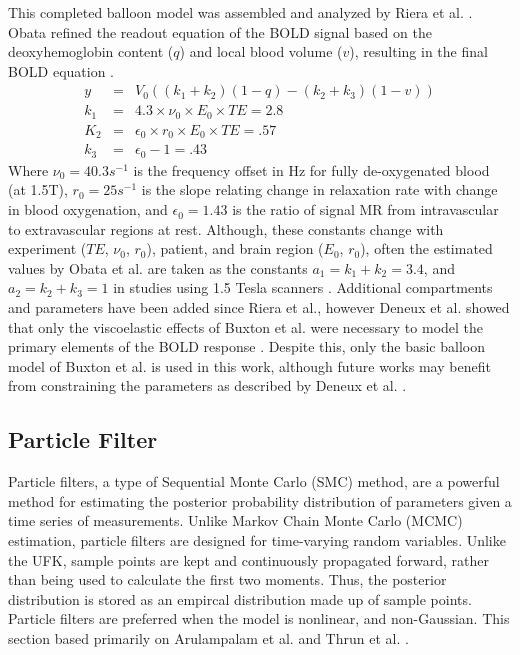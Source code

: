 \documentclass[journal]{./IEEEtran}
\begin{document}
This completed balloon model was assembled and analyzed
by Riera et al. \cite{Riera2003}. Obata refined the readout equation 
of the BOLD signal based on the deoxyhemoglobin content ($q$) and local 
blood volume ($v$), resulting in the final BOLD equation \cite{Obata2004}.
\begin{eqnarray}
y   &=& V_0((k_1 + k_2)(1-q) - (k_2 + k_3)(1-v))\\
k_1 &=& 4.3 \times \nu_0 \times E_0 \times TE = 2.8 \nonumber \\
K_2 &=& \epsilon_0 \times r_0 \times E_0 \times TE = .57 \nonumber \\
k_3 &=& \epsilon_0 - 1 = .43 \nonumber
\label{eq:boldout}
\end{eqnarray}
Where $\nu_0 = 40.3 s^{-1}$  is the frequency offset in Hz for fully
de-oxygenated blood (at 1.5T), $r_0 = 25 s^{-1}$  is the slope relating
change in relaxation rate with change in blood oxygenation, and
$\epsilon_0 = 1.43$ is the ratio of signal MR from intravascular to 
extravascular regions at rest. Although, these constants change with 
experiment ($TE$, $\nu_0$, $r_0$), patient, and brain 
region ($E_0$, $r_0$), often the estimated values by Obata et al. are 
taken as the constants $a_1 = k_1 + k_2 = 3.4$, and $a_2 = k_2+k_3 = 1$ in 
studies using 1.5 Tesla scanners \cite{Obata2004}.
Additional compartments and parameters have been added since 
Riera et al., however Deneux et al. showed that only the viscoelastic
effects of Buxton et al. were necessary to model the primary 
elements of the BOLD response \cite{Riera2003, Deneux2006, Buxton2004}.
Despite this, only the basic balloon model of Buxton et al. is
used in this work, although future works may benefit from constraining
the parameters as described by Deneux et al. \cite{Buxton2004, Deneux2006}.

\subsection{Particle Filter}
\label{sec:ParticleFilters}
Particle filters, a type of Sequential Monte Carlo (SMC) method,
are a powerful method for estimating the posterior probability distribution
 of parameters given a time series of measurements. Unlike Markov 
Chain Monte Carlo (MCMC) estimation, particle filters are designed for 
time-varying random variables. Unlike the UFK, sample points are kept
and continuously propagated forward, rather than being used to calculate
the first two moments. Thus, the posterior distribution is
stored as an empircal distribution made up of sample points.
Particle filters are preferred when the model is nonlinear, 
and non-Gaussian. This section based primarily on 
Arulampalam et al. and Thrun et al. \cite{Arulampalam2002a, Thrun2005}.
\end{document}
